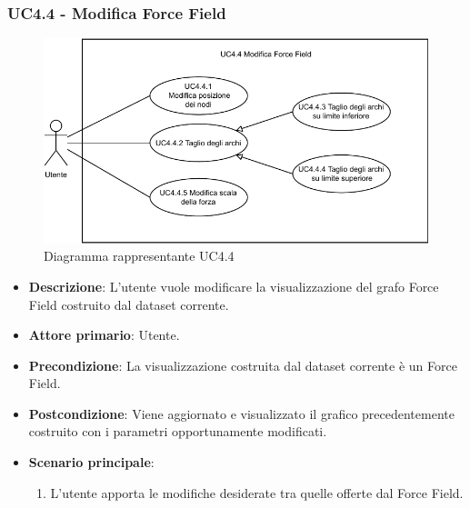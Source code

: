 \newpage
\subsubsection{UC4.4 - Modifica Force Field}
\label{ssub:uc4.4}
\begin{figure}[h]
    \centering
    \includegraphics[width=0.6  \textwidth]{componenti/casi-duso/diagrammi/UC4_4.pdf}
    \caption{Diagramma rappresentante UC4.4}
    \label{fig:UC4.4}
\end{figure}


\begin{itemize}
    \item \textbf{Descrizione}: L’utente vuole modificare la visualizzazione del grafo Force Field
                                costruito dal dataset corrente.

    \item \textbf{Attore primario}: Utente.

    \item \textbf{Precondizione}:   La visualizzazione costruita dal dataset corrente è un Force Field.

    \item \textbf{Postcondizione}:  Viene aggiornato e visualizzato il grafico precedentemente costruito con i parametri opportunamente modificati.

	\item \textbf{Scenario principale}:
		\begin{enumerate}
            \item L'utente apporta le modifiche desiderate tra quelle offerte dal Force Field.
        \end{enumerate}
\end{itemize}


